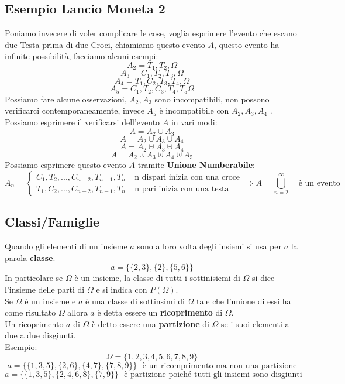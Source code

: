\subsection{Esempio Lancio Moneta 2}
Poniamo invecere di voler complicare le cose, voglia esprimere l'evento che escano due Testa prima di due Croci, chiamiamo questo evento $A$, questo evento ha infinite possibilità, facciamo alcuni esempi:
$$ A_2 = T_1, T_2, \Omega $$
$$ A_3 = C_1, T_2, T_3, \Omega $$
$$ A_4 = T_1, C_2, T_3, T_4, \Omega $$
$$ A_5 = C_1, T_2, C_3, T_4, T_5 \Omega $$
Possiamo fare alcune osservazioni, $A_2, A_3$ sono incompatibili, non possono verificarci contemporaneamente, invece $A_5$ è incompatibile con $A_2,A_3,A_4$ .
Possiamo esprimere il verificarsi dell'evento $A$ in vari modi:\\
$$ A = A_2 \cup A_3 $$
$$ A = A_2 \cup A_3 \cup A_4 $$
$$ A = A_2 \uplus A_3  \uplus A_4 $$
$$ A = A_2 \uplus A_3 \uplus A_4 \uplus A_5 $$
Possiamo esprimere questo evento $A$ tramite \textbf{Unione Numberabile}:
\begin{equation*}
A_n =
\begin{cases}
C_1,T_2,...,C_{n-2},T_{n-1},T_n  \:\:\:\:\:\text{n dispari inizia con una croce}\\
T_1,C_2,...,C_{n-2},T_{n-1},T_n  \:\:\:\:\:\text{n pari inizia con una testa}
\end{cases}
\Rightarrow A = \bigcup_{n=2}^{\infty} \:\:\:\:\: \text{è un evento}
\end{equation*}

\subsection{Classi/Famiglie}
Quando gli elementi di un insieme $a$ sono a loro volta degli insiemi si usa per $a$ la parola \textbf{classe}.
$$ a = \{ \{2,3\},\{2\},\{5,6\} \}$$
In particolare se $\Omega$ è un insieme, la classe di tutti i sottinisiemi di $\Omega$ si dice l'insieme delle parti di $\Omega$ e si indica con $P(\Omega)$.\\
Se $\Omega$ è un insieme e $a$ è una classe di sottinsimi di $\Omega$ tale che l'unione di essi ha come risultato $\Omega$ allora $a$ è detta essere un \textbf{ricoprimento} di $\Omega$.\\
Un ricoprimento $a$ di $\Omega$ è detto essere una \textbf{partizione} di $\Omega$ se i suoi elementi a due a due disgiunti.\\
Esempio:
 $$ \Omega= \{1,2,3,4,5,6,7,8,9\} $$
 $$ a = \{ \{1,3,5\},\{2,6\},\{4,7\},\{7,8,9\} \} \:\:\: \text{è un ricomprimento ma non una partizione}$$
 $$ a = \{ \{1,3,5\},\{2,4,6,8\},\{7,9\} \} \:\:\: \text{è partizione poiché  tutti gli insiemi sono disgiunti}$$

